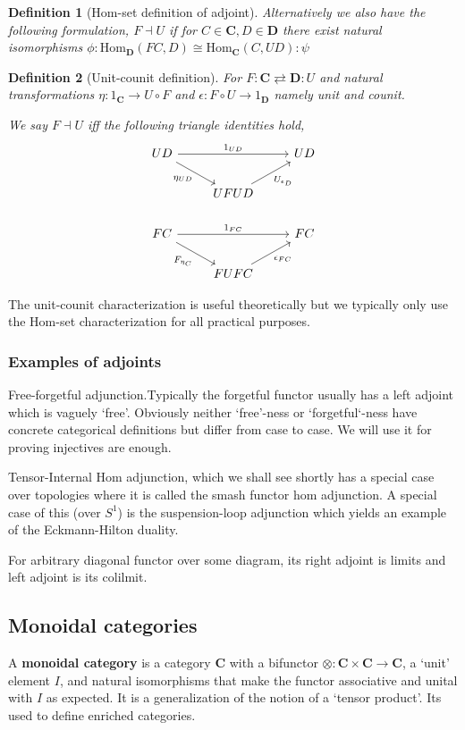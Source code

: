 \documentclass[12pt]{article}
\numberwithin{equation}{section}
\newtheorem{definition}{Definition}[section]
\begin{document}
	\begin{definition}[Hom-set definition of adjoint]
			Alternatively we also have the following formulation, $F \dashv U$ if for $C\in \mathbf{C}, D \in \mathbf{D}$ there exist natural isomorphisms $\phi: \textrm{Hom}_\mathbf{D}(FC, D) \cong \textrm{Hom}_\mathbf{C}(C, UD):\psi$
	\end{definition}
	
	\begin{definition}[Unit-counit definition]
		For $F: \mathbf{C} \rightleftarrows \mathbf{D}:U$ and natural transformations $\eta: 1_\mathbf{C} \to U \circ F$ and $\epsilon: F \circ U \to 1_\mathbf{D}$ namely unit and counit. 
		
		We say $F \dashv U$ iff the following triangle identities hold,
		\[\begin{tikzcd}
			UD && UD \\
			& UFUD \\
			FC && FC \\
			& FUFC
			\arrow["{1_{UD}}", from=1-1, to=1-3]
			\arrow["{\eta_{UD}}"', from=1-1, to=2-2]
			\arrow["{U_{\epsilon_D}}"', from=2-2, to=1-3]
			\arrow["{1_{FC}}", from=3-1, to=3-3]
			\arrow["{F_{\eta_C}}"', from=3-1, to=4-2]
			\arrow["{\epsilon_{FC}}"', from=4-2, to=3-3]
		\end{tikzcd}\]
	\end{definition}
	The unit-counit characterization is useful theoretically but we typically only use the Hom-set characterization for all practical purposes.
	
	\subsubsection{Examples of adjoints}
	Free-forgetful adjunction.Typically the forgetful functor usually has a left adjoint which is vaguely `free'. Obviously neither `free'-ness or `forgetful`-ness have concrete categorical definitions but differ from case to case. We will use it for proving injectives are enough.
	
	Tensor-Internal Hom adjunction, which we shall see shortly has a special case over topologies where it is called the smash functor hom adjunction. A special case of this (over $S^1$) is the suspension-loop adjunction which yields an example of the Eckmann-Hilton duality. 
	
	For arbitrary diagonal functor over some diagram, its right adjoint is limits and left adjoint is its colilmit.
	
		\subsection{Monoidal categories}
	A \textbf{monoidal category} is a category $\mathbf{C}$ with a bifunctor $ \otimes: \mathbf{C} \times \mathbf{C} \to \mathbf{C}$, a `unit' element $I$, and natural isomorphisms that make the functor associative and unital with $I$ as expected. It is a generalization of the notion of a `tensor product'. Its used to define enriched categories.
	
\end{document}
